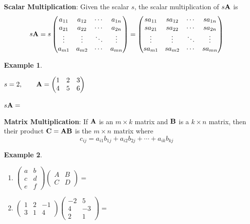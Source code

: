 \documentclass[
]{book}
\theoremstyle{definition}
\theoremstyle{definition}
\newtheorem{example}{Example}[chapter]
\theoremstyle{definition}
\theoremstyle{remark}
\begin{document}
\textbf{Scalar Multiplication}: Given the scalar \(s\), the scalar multiplication of \(s {\bf A}\) is
\[ s {\bf A}=  s \begin{pmatrix}
            a_{11} & a_{12} & \cdots & a_{1n} \\
            a_{21} & a_{22} & \cdots & a_{2n} \\
            \vdots & \vdots & \ddots & \vdots \\
            a_{m1} & a_{m2} & \cdots & a_{mn}
        \end{pmatrix}
        = \begin{pmatrix}
            s a_{11} & s a_{12} & \cdots & s a_{1n} \\
            s a_{21} & s a_{22} & \cdots & s a_{2n} \\
            \vdots & \vdots & \ddots & \vdots \\
            s a_{m1} & s a_{m2} & \cdots & s a_{mn}
        \end{pmatrix}\]

\begin{example}
\protect\hypertarget{exm:scalarmulti}{}{\label{exm:scalarmulti} }

\(s=2, \qquad {\bf A}=\begin{pmatrix} 1 & 2 & 3 \\ 4 & 5 & 6 \end{pmatrix}\)

\(s {\bf A} =\)
\end{example}

\textbf{Matrix Multiplication}: If \({\bf A}\) is an \(m\times k\) matrix and \(\bf B\) is a \(k\times n\) matrix, then their product \(\bf C = A B\) is the \(m\times n\) matrix where
\[c_{ij}=a_{i1}b_{1j}+a_{i2}b_{2j}+\cdots+a_{ik}b_{kj}\]

\begin{example}
\protect\hypertarget{exm:matrixmulti}{}{\label{exm:matrixmulti} }

\begin{enumerate}
\def\labelenumi{\arabic{enumi}.}
\item
  \(\begin{pmatrix} a&b\\c&d\\e&f \end{pmatrix} \begin{pmatrix} A&B\\C&D \end{pmatrix}  =\)
\item
  \(\begin{pmatrix} 1&2&-1\\3&1&4 \end{pmatrix} \begin{pmatrix} -2&5\\4&-3\\2&1\end{pmatrix} =\)
\end{enumerate}
\end{example}
\end{document}
